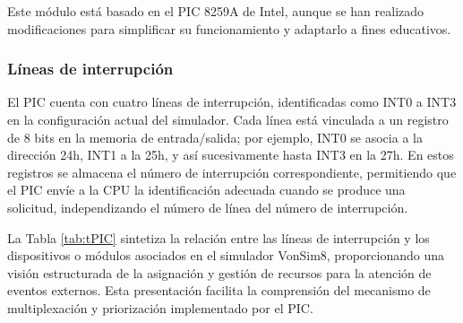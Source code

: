 \documentclass[12pt,oneside]{templates/unerthesis}
\begin{document}
Este módulo está basado en el PIC 8259A de Intel, aunque se han realizado modificaciones para simplificar su funcionamiento y adaptarlo a fines educativos.

\hypertarget{luxedneas-de-interrupciuxf3n}{%
\subsubsection{Líneas de interrupción}\label{luxedneas-de-interrupciuxf3n}}

El PIC cuenta con cuatro líneas de interrupción, identificadas como INT0 a INT3 en la configuración actual del simulador. Cada línea está vinculada a un registro de 8 bits en la memoria de entrada/salida; por ejemplo, INT0 se asocia a la dirección 24h, INT1 a la 25h, y así sucesivamente hasta INT3 en la 27h. En estos registros se almacena el número de interrupción correspondiente, permitiendo que el PIC envíe a la CPU la identificación adecuada cuando se produce una solicitud, independizando el número de línea del número de interrupción.

La Tabla \ref{tab:tPIC} sintetiza la relación entre las líneas de interrupción y los dispositivos o módulos asociados en el simulador VonSim8, proporcionando una visión estructurada de la asignación y gestión de recursos para la atención de eventos externos. Esta presentación facilita la comprensión del mecanismo de multiplexación y priorización implementado por el PIC.

\begin{table}[!h]
\centering
\caption{\label{tab:tPIC}Líneas de interrupción y dispositivos asociados}
\centering
{}
\end{table}
\end{document}
